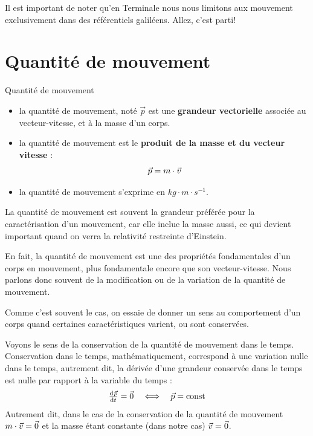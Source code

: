 \documentclass[11pt,a4paper]{article}
\begin{document}
Il est important de noter qu'en Terminale nous nous limitons aux mouvement exclusivement dans des référentiels galiléens. Allez, c'est parti! 

\section{Quantité de mouvement}

\begin{defn}{Quantité de mouvement }
\begin{itemize}
    \item la quantité de mouvement, noté $\Vec{p}$ est une \textbf{grandeur vectorielle} associée au vecteur-vitesse, et à la masse d'un corps. 
    \item la quantité de mouvement est le \textbf{produit de la masse et du vecteur vitesse} : 
    \[ \Vec{p} = m\cdot\vec{v} \]
    \item la quantité de mouvement s'exprime en $kg\cdot m\cdot s^{-1}$. 
\end{itemize}
\end{defn}

\begingroup
\setlength{\columnsep}{15pt}%
\begin{table}
\begin{rmrq}
\small{La quantité de mouvement est souvent la grandeur préférée pour la caractérisation d’un mouvement, car elle inclue la masse aussi, ce qui devient important quand on verra la relativité restreinte d’Einstein. 

En fait, la quantité de mouvement est une des propriétés fondamentales d'un corps en mouvement, plus fondamentale encore que son vecteur-vitesse. Nous parlons donc souvent de la modification ou de la variation de la quantité de mouvement. }
\end{rmrq}
\end{table}

Comme c'est souvent le cas, on essaie de donner un sens au comportement d'un corps quand certaines caractéristiques varient, ou sont conservées. 

Voyons le sens de la conservation de la quantité de mouvement dans le temps. Conservation dans le temps, mathématiquement, correspond à une variation nulle dans le temps, autrement dit, la dérivée d'une grandeur conservée dans le temps est nulle par rapport à la variable du temps : 
\[
\od{\vp}{t} = \Vec{0} \quad \Longleftrightarrow\quad \vp = \text{const}
\]
Autrement dit, dans le cas de la conservation de la quantité de mouvement $m\cdot\vec{v} = \Vec{0}$ et la masse étant constante (dans notre cas) $ \vec{v} = \Vec{0}$. 
\end{document}
